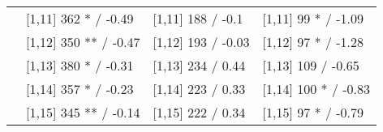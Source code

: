 \begin{table}
\begin{tabular}[t]{llll}
 & {}[1,11] 362 * / -0.49 & {}[1,11] 188  / -0.1 & {}[1,11] 99 * / -1.09\\
 & {}[1,12] 350 ** / -0.47 & {}[1,12] 193  / -0.03 & {}[1,12] 97 * / -1.28\\
\addlinespace
 & {}[1,13] 380 * / -0.31 & {}[1,13] 234  / 0.44 & {}[1,13] 109  / -0.65\\
 & {}[1,14] 357 * / -0.23 & {}[1,14] 223  / 0.33 & {}[1,14] 100 * / -0.83\\
 & {}[1,15] 345 ** / -0.14 & {}[1,15] 222  / 0.34 & {}[1,15] 97 * / -0.79\\
\bottomrule
\end{tabular}
\end{table}
